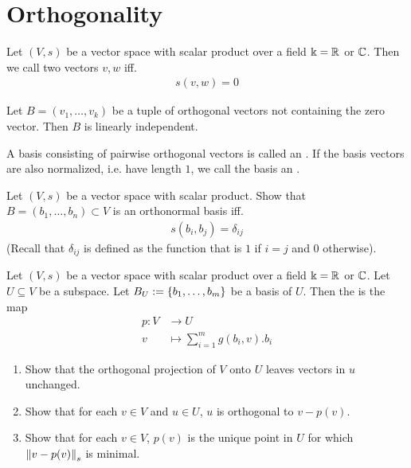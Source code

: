 \section{Orthogonality}
\begin{definition}
	Let $(V,s)$ be a vector space with scalar product over a field $\Bbbk = \mathbb{R}$ or $\mathbb{C}$. Then we call two vectors $v,w$  iff.
	\begin{align*}
		s(v,w) = 0
	\end{align*}
\end{definition}
\begin{exercise}
	Let $B = (v_1, \hdots, v_k)$ be a tuple of orthogonal vectors not containing the zero vector. Then $B$ is linearly independent.
\end{exercise}
\begin{definition}
	A basis consisting of pairwise orthogonal vectors is called an . If the basis vectors are also normalized, i.e. have length $1$, we call the basis an .
\end{definition}
\begin{exercise}
	Let $(V,s)$ be a vector space with scalar product.
	Show that $B = (b_1, \hdots, b_n) \subset V$ is an orthonormal basis iff.
	\begin{align*}
		s(b_i,b_j)
		= \delta_{ij}
	\end{align*}
	(Recall that $\delta_{ij}$ is defined as the function that is $1$ if $i = j$ and $0$ otherwise).
\end{exercise}
\begin{definition}
	Let $(V,s)$ be a vector space with scalar product over a field $\Bbbk = \mathbb{R}$ or $\mathbb{C}$. Let $U \subseteq V$ be a subspace. Let $B_U := \qty{b_1, \hdots, b_m}$ be a basis of $U$. Then the  is the map
	\begin{align*}
		p : V &\to U\\
		v &\mapsto \sum_{i = 1}^m g(b_i,v).b_i
	\end{align*}
\end{definition}
\begin{exercise}
	\begin{enumerate}
		\item Show that the orthogonal projection of $V$ onto $U$ leaves vectors in $u$ unchanged.
		\item Show that for each $v \in V$ and $u \in U$, $u$ is orthogonal to $v - p(v)$.
		\item Show that for each $v \in V$, $p(v)$ is the unique point in $U$ for which $\norm{v - p(v)}_s$ is minimal.
	\end{enumerate}
\end{exercise}
